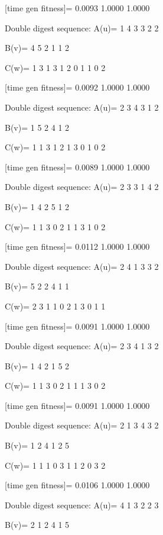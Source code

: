 [time gen fitness]=
    0.0093    1.0000    1.0000

Double digest sequence:
A(u)=
     1     4     3     3     2     2

B(v)=
     4     5     2     1     1     2

C(w)=
     1     3     1     3     1     2     0     1     1     0     2

[time gen fitness]=
    0.0092    1.0000    1.0000

Double digest sequence:
A(u)=
     2     3     4     3     1     2

B(v)=
     1     5     2     4     1     2

C(w)=
     1     1     3     1     2     1     3     0     1     0     2

[time gen fitness]=
    0.0089    1.0000    1.0000

Double digest sequence:
A(u)=
     2     3     3     1     4     2

B(v)=
     1     4     2     5     1     2

C(w)=
     1     1     3     0     2     1     1     3     1     0     2

[time gen fitness]=
    0.0112    1.0000    1.0000

Double digest sequence:
A(u)=
     2     4     1     3     3     2

B(v)=
     5     2     2     4     1     1

C(w)=
     2     3     1     1     0     2     1     3     0     1     1

[time gen fitness]=
    0.0091    1.0000    1.0000

Double digest sequence:
A(u)=
     2     3     4     1     3     2

B(v)=
     1     4     2     1     5     2

C(w)=
     1     1     3     0     2     1     1     1     3     0     2

[time gen fitness]=
    0.0091    1.0000    1.0000

Double digest sequence:
A(u)=
     2     1     3     4     3     2

B(v)=
     1     2     4     1     2     5

C(w)=
     1     1     1     0     3     1     1     2     0     3     2

[time gen fitness]=
    0.0106    1.0000    1.0000

Double digest sequence:
A(u)=
     4     1     3     2     2     3

B(v)=
     2     1     2     4     1     5

